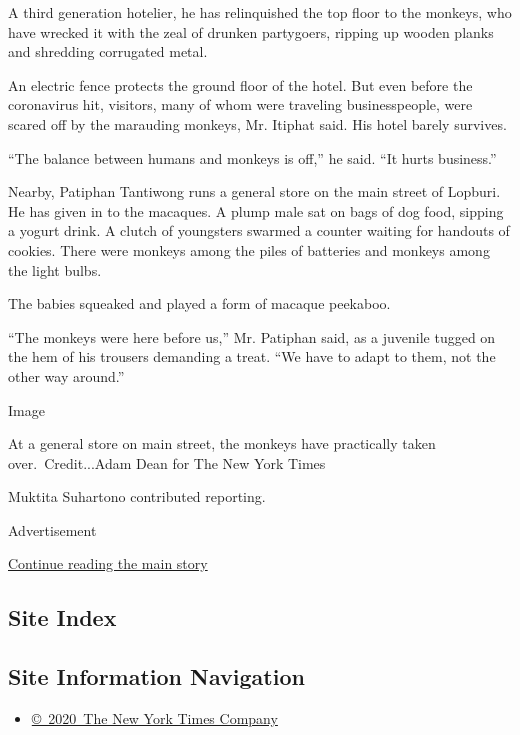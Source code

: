 A third generation hotelier, he has relinquished the top floor to the
monkeys, who have wrecked it with the zeal of drunken partygoers,
ripping up wooden planks and shredding corrugated metal.

An electric fence protects the ground floor of the hotel. But even
before the coronavirus hit, visitors, many of whom were traveling
businesspeople, were scared off by the marauding monkeys, Mr. Itiphat
said. His hotel barely survives.

``The balance between humans and monkeys is off,'' he said. ``It hurts
business.''

Nearby, Patiphan Tantiwong runs a general store on the main street of
Lopburi. He has given in to the macaques. A plump male sat on bags of
dog food, sipping a yogurt drink. A clutch of youngsters swarmed a
counter waiting for handouts of cookies. There were monkeys among the
piles of batteries and monkeys among the light bulbs.

The babies squeaked and played a form of macaque peekaboo.

``The monkeys were here before us,'' Mr. Patiphan said, as a juvenile
tugged on the hem of his trousers demanding a treat. ``We have to adapt
to them, not the other way around.''

Image

At a general store on main street, the monkeys have practically taken
over.~Credit...Adam Dean for The New York Times

Muktita Suhartono contributed reporting.

Advertisement

\protect\hyperlink{after-bottom}{Continue reading the main story}

\hypertarget{site-index}{%
\subsection{Site Index}\label{site-index}}

\hypertarget{site-information-navigation}{%
\subsection{Site Information
Navigation}\label{site-information-navigation}}

\begin{itemize}
\tightlist
\item
  \href{https://help.nytimes3xbfgragh.onion/hc/en-us/articles/115014792127-Copyright-notice}{©~2020~The
  New York Times Company}
\end{itemize}

